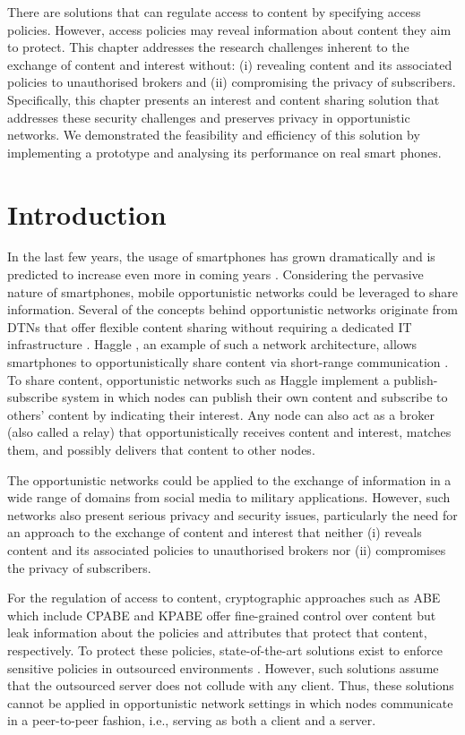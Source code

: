 \documentclass[epsfig,a4paper,11pt,titlepage]{book}
\numberwithin{algorithm}{chapter}
\begin{document}
There are solutions that can regulate access to content by specifying access policies. However, access policies may reveal information about content they aim to protect. This chapter addresses the research challenges inherent to the exchange of content and interest without: (i) revealing content and its associated policies to unauthorised brokers and (ii) compromising the privacy of subscribers. Specifically, this chapter presents an interest and content sharing solution that addresses these security challenges and preserves privacy in opportunistic networks. We demonstrated the feasibility and efficiency of this solution by implementing a prototype and analysing its performance on real smart phones.

\section{Introduction}

In the last few years, the usage of smartphones has grown dramatically and is predicted to increase even more in coming years \cite{Emarketer:2013}. Considering the pervasive nature of smartphones, mobile opportunistic networks could be leveraged to share information. Several of the concepts behind opportunistic networks originate from \glspl{DTN} that offer flexible content sharing without requiring a dedicated \gls{IT} infrastructure \cite{ Pelusi:2006}. Haggle \cite{Haggle:2010}, an example of such a network architecture, allows smartphones to opportunistically share content via short-range communication \cite{ Nordstrom:2009}. To share content, opportunistic networks such as Haggle implement a publish-subscribe system in which nodes can publish their own content and subscribe to others' content by indicating their interest. Any node can also act as a broker (also called a relay) that opportunistically receives content and interest, matches them, and possibly delivers that content to other nodes.

The opportunistic networks could be applied to the exchange of information in a wide range of domains from social media to military applications. However, such networks also present serious privacy and security issues, particularly the need for an approach to the exchange of content and interest that neither (i) reveals content and its associated policies to unauthorised brokers nor (ii) compromises the privacy of subscribers.

For the regulation of access to content, cryptographic approaches such as \gls{ABE} which include \gls{CPABE} \cite{Bethencourt:2007} and \gls{KPABE} \cite{Goyal:2006} offer fine-grained control over content but leak information about the policies and attributes that protect that content, respectively. To protect these policies, state-of-the-art solutions exist to enforce sensitive policies in outsourced environments \cite{Asghar2013-COSE, Asghar2011-ARES, Kapadia:2007}. However, such solutions assume that the outsourced server does not collude with any client. Thus, these solutions cannot be applied in opportunistic network settings in which nodes communicate in a peer-to-peer fashion, i.e., serving as both a client and a server.
\end{document}
